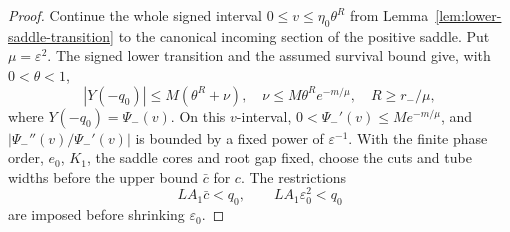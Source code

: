 \begin{proof}
Continue the whole signed interval $0\le v\le\eta_0\theta^R$
from Lemma~\ref{lem:lower-saddle-transition} to the canonical incoming
section of the positive saddle. Put $\mu=\varepsilon^2$.
The signed lower transition and the assumed survival bound give, with
$0<\theta<1$,
\begin{equation}\label{eq:lower-connector-input}
 |Y(-q_0)|\le M(\theta^R+\nu),\quad
 \nu\le M\theta^R e^{-m/\mu},\quad R\ge r_-/\mu,
\end{equation}
where $Y(-q_0)=\Psi_-(v)$. On this $v$-interval,
$0<\Psi_-'(v)\le M e^{-m/\mu}$, and
$|\Psi_-''(v)/\Psi_-'(v)|$ is bounded
by a fixed power of $\varepsilon^{-1}$. With the finite phase order,
$e_0$, $K_1$, the saddle cores and root gap fixed, choose the cuts and
tube widths before the upper bound $\bar c$ for $c$. The restrictions
\begin{equation}\label{eq:lower-connector-geometry}
 LA_1\bar c<q_0,\qquad LA_1\varepsilon_0^2<q_0
\end{equation}
are imposed before shrinking $\varepsilon_0$.


\end{proof}
